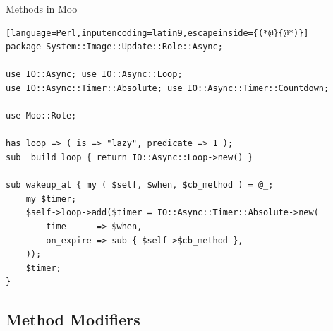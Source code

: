 \documentclass[ngerman,xcolor={table,dvipsnames},smaller,compress,hyperref={bookmarks,colorlinks},handout]{beamer}%
\begin{document}
\begin{frame}[t,fragile]

\begin{block}{Methods in Moo}
\scriptsize
\begin{lstlisting}[language=Perl,inputencoding=latin9,escapeinside={(*@}{@*)}]
package System::Image::Update::Role::Async;

use IO::Async; use IO::Async::Loop;
use IO::Async::Timer::Absolute; use IO::Async::Timer::Countdown;

use Moo::Role;

has loop => ( is => "lazy", predicate => 1 );
sub _build_loop { return IO::Async::Loop->new() }

sub wakeup_at { my ( $self, $when, $cb_method ) = @_;
    my $timer;
    $self->loop->add($timer = IO::Async::Timer::Absolute->new(
        time      => $when,
        on_expire => sub { $self->$cb_method },
    ));
    $timer;
}
\end{lstlisting}
\end{block}


\end{frame}

\subsection{Method Modifiers}
\end{document}
